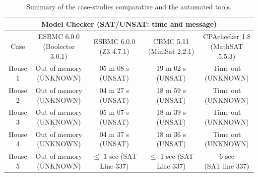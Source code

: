\documentclass[review]{elsarticle}
\begin{document}
%
\begin{table}
\centering
\caption{Summary of the case-studies comparative and the automated tools.}\label{cases}
\begin{scriptsize}
\begin{tabular}{|c|c|c|c|c|}
\hline
\hline
\multicolumn{5}{|c|}{Model Checker (SAT/UNSAT: time and message)}\\
\hline
Case &  \makecell{ESBMC 6.0.0\\(Boolector 3.0.1)} & \makecell {ESBMC 6.0.0\\(Z3 4.7.1)} & \makecell{CBMC 5.11\\(MiniSat 2.2.1)} & \makecell{CPAchecker 1.8\\(MathSAT 5.5.3)}\\
\hline
\hline
House 1 &  \makecell{Out of memory \\(UNKNOWN)} & \makecell{05 m 08 s \\(UNSAT)} & \makecell{19 m 02 s \\(UNSAT)} & \makecell{Time out \\ (UNKNOWN)}\\
\hline
House 2 &  \makecell{Out of memory \\(UNKNOWN)} & \makecell{04 m 27 s \\(UNSAT)} & \makecell{18 m 59 s \\(UNSAT)} & \makecell{Time out \\ (UNKNOWN)}\\
\hline
House 3 &  \makecell{Out of memory \\(UNKNOWN)} & \makecell{05 m 07 s \\(UNSAT)} & \makecell{18 m 39 s \\(UNSAT)} & \makecell{Time out \\ (UNKNOWN)}\\
\hline
House 4 &  \makecell{Out of memory \\(UNKNOWN)} & \makecell{04 m 37 s \\(UNSAT)} & \makecell{18 m 36 s \\(UNSAT)} & \makecell{Time out \\ (UNKNOWN)}\\
\hline
House 5 &  \makecell{Out of memory \\(UNKNOWN)} & \makecell{$\leq$ 1 sec \\(SAT Line 337)} & \makecell{$\leq$ 1 sec \\(SAT Line 337)} & \makecell{6 sec \\ (SAT line 337)}\\
\hline
\hline
\end{tabular}
\end{scriptsize}
\end{table}
\end{document}
